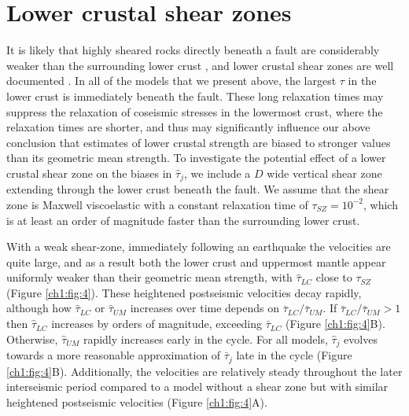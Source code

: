 \section{Lower crustal shear zones}
It is likely that highly sheared rocks directly beneath a fault are
considerably weaker than the surrounding lower crust
\citep[e.g.,][]{Montesi2003}, and lower crustal shear zones are well
documented \citep[e.g.,][]{Vauchez2003}. In all of the models that we
present above, the largest $\tau$ in the lower crust is immediately
beneath the fault.  These long relaxation times may suppress the
relaxation of coseismic stresses in the lowermost crust, where the
relaxation times are shorter, and thus may significantly influence our
above conclusion that estimates of lower crustal strength are biased
to stronger values than its geometric mean strength. To investigate
the potential effect of a lower crustal shear zone on the biases in
$\hat{\tau}_j$, we include a $D$ wide vertical shear zone extending
through the lower crust beneath the fault.  We assume that the shear
zone is Maxwell viscoelastic with a constant relaxation time of
$\tau_{SZ} = 10^{-2}$, which is at least an order of magnitude faster
than the surrounding lower crust.

With a weak shear-zone, immediately following an earthquake the
velocities are quite large, and as a result both the lower crust and
uppermost mantle appear uniformly weaker than their geometric mean
strength, with $\hat{\tau}_{LC}$ close to $\tau_{SZ}$ (Figure
\ref{ch1:fig:4}). These heightened postseismic velocities decay
rapidly, although how $\hat{\tau}_{LC}$ or $\hat{\tau}_{UM}$ increases
over time depends on $\bar{\tau}_{LC}/\bar{\tau}_{UM}$. If
$\bar{\tau}_{LC}/\bar{\tau}_{UM} > 1$ then $\hat{\tau}_{LC}$ increases
by orders of magnitude, exceeding $\bar{\tau}_{LC}$ (Figure
\ref{ch1:fig:4}B). Otherwise, $\hat{\tau}_{UM}$ rapidly increases
early in the cycle. For all models, $\hat{\tau}_j$ evolves towards a
more reasonable approximation of $\bar{\tau}_j$ late in the cycle
(Figure \ref{ch1:fig:4}B). Additionally, the velocities are relatively
steady throughout the later interseismic period compared to a model
without a shear zone but with similar heightened postseismic
velocities (Figure \ref{ch1:fig:4}A).

